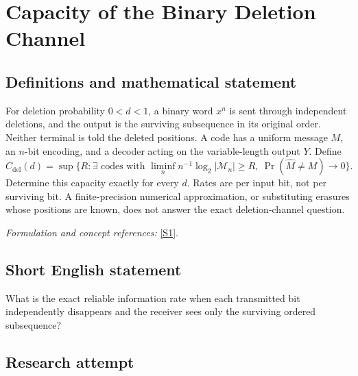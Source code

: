\documentclass[11pt,a4paper]{article}
\newcommand{\sref}[2]{\hyperlink{source:#1:#2}{[S#2]}}
\newif\ifshowcatalogue
\newcommand{\cataloguescope}[1]{\ifshowcatalogue
 \paragraph{Exact scope in the supplied catalogue.}
 \begin{quote}\small #1\end{quote}\fi}
\numberwithin{equation}{section}
\begin{document}
\setcounter{section}{0}
\clearpage
\section*{\texorpdfstring{Capacity of the Binary Deletion Channel}{Capacity of the Binary Deletion Channel}}\label{30006798}
\subsection{Definitions and mathematical statement}
For deletion probability $0<d<1$, a binary word $x^n$ is sent through independent deletions, and the output is the surviving subsequence in its original order. Neither terminal is told the deleted positions. A code has a uniform message $M$, an $n$-bit encoding, and a decoder acting on the variable-length output $Y$. Define
\[
 C_{\mathrm{del}}(d)=\sup\{R:\exists\text{ codes with }\liminf_n n^{-1}\log_2|\mathcal M_n|\ge R,
 \ \Pr(\widehat M\ne M)\to0\}.
\]
Determine this capacity exactly for every $d$. Rates are per input bit, not per surviving bit. A finite-precision numerical approximation, or substituting erasures whose positions are known, does not answer the exact deletion-channel question.
\par\smallskip\textit{Formulation and concept references:} \sref{30006798}{1}.
\cataloguescope{Determine the exact average-error Shannon capacity C\_del(d), in bits per input bit, of the binary deletion channel for every real d with 0<d<1. Each input bit is independently deleted with probability d; surviving bits retain their order, and neither terminal observes the deletion pattern.}
\subsection{Short English statement}
What is the exact reliable information rate when each transmitted bit independently disappears and the receiver sees only the surviving ordered subsequence?
\subsection{Research attempt}
\end{document}
